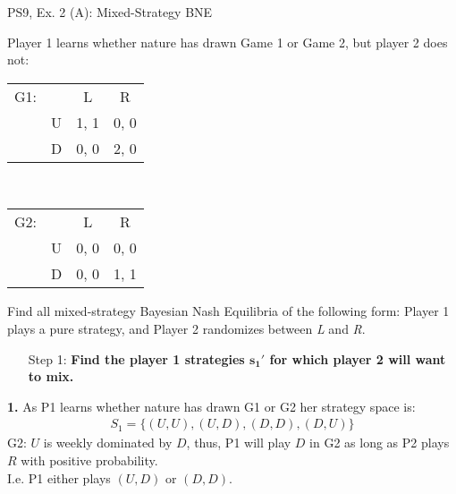 \begin{frame}{PS9, Ex. 2 (A): Mixed-Strategy BNE}
    \begin{multicols}{2}
      Player 1 learns whether nature has drawn Game 1 or Game 2, but player 2 does not:
      \begin{table}
        \begin{tabular}{ll|c|c|}
          \multicolumn{1}{c}{G1:} & \multicolumn{1}{c}{} & \multicolumn{1}{c}{L} & \multicolumn{1}{c}{R} \\\cline{3-4}
          & U & 1, 1 & 0, 0 \\\cline{3-4}
          & D & 0, 0 & 2, 0 \\\cline{3-4}
        \end{tabular}\\\bigskip
        \begin{tabular}{ll|c|c|}
          \multicolumn{1}{c}{G2:} & \multicolumn{1}{c}{} & \multicolumn{1}{c}{L} & \multicolumn{1}{c}{R} \\\cline{3-4}
          & U & 0, 0 & 0, 0 \\\cline{3-4}
          & D & 0, 0 & 1, 1 \\\cline{3-4}
        \end{tabular}
      \end{table}
      Find all mixed-strategy Bayesian Nash Equilibria of the following form: Player 1 plays a pure strategy, and Player 2 randomizes between \textit{L} and \textit{R}.
      \begin{itemize}
        \item[Step 1:] \textbf{Find the player 1 strategies $\bm{s_1'}$ for which player 2 will want to mix.}
      \end{itemize}
      \vfill\null\columnbreak
      \textbf{1.} As P1 learns whether nature has drawn G1 or G2 her strategy space is:
      \begin{align*}
        S_1=\{(U,U),(U,D),(D,D),(D,U)\}
      \end{align*}
      G2: $U$ is weekly dominated by $D$, thus, P1 will play $D$ in G2 as long as P2 plays $R$ with positive probability.\\\medskip I.e. P1 either plays $(U,D)$ or $(D,D)$.
      \vfill\null
    \end{multicols}
\end{frame}
